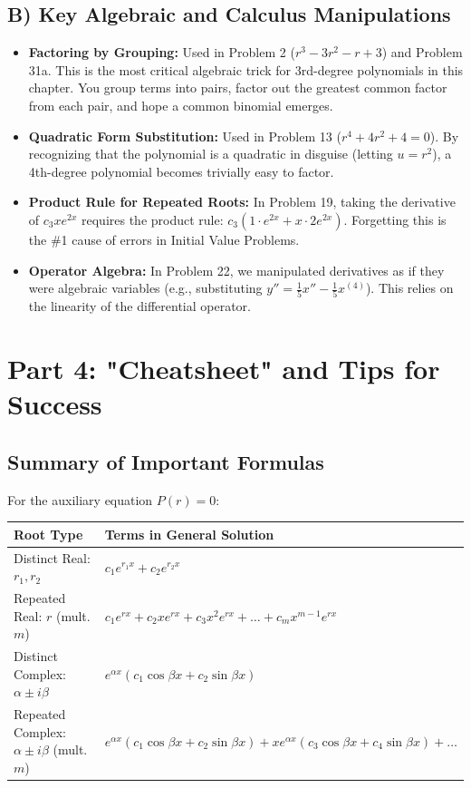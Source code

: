\documentclass[11pt]{article}
\begin{document}
\subsection{B) Key Algebraic and Calculus Manipulations}
\begin{itemize}
    \item \textbf{Factoring by Grouping:} Used in Problem 2 ($r^3 - 3r^2 - r + 3$) and Problem 31a. This is the most critical algebraic trick for 3rd-degree polynomials in this chapter. You group terms into pairs, factor out the greatest common factor from each pair, and hope a common binomial emerges.
    \item \textbf{Quadratic Form Substitution:} Used in Problem 13 ($r^4 + 4r^2 + 4 = 0$). By recognizing that the polynomial is a quadratic in disguise (letting $u = r^2$), a 4th-degree polynomial becomes trivially easy to factor.
    \item \textbf{Product Rule for Repeated Roots:} In Problem 19, taking the derivative of $c_3 x e^{2x}$ requires the product rule: $c_3(1 \cdot e^{2x} + x \cdot 2e^{2x})$. Forgetting this is the \#1 cause of errors in Initial Value Problems.
    \item \textbf{Operator Algebra:} In Problem 22, we manipulated derivatives as if they were algebraic variables (e.g., substituting $y'' = \frac{1}{5}x'' - \frac{1}{5}x^{(4)}$). This relies on the linearity of the differential operator.
\end{itemize}

\newpage
\section{Part 4: "Cheatsheet" and Tips for Success}

\subsection{Summary of Important Formulas}
For the auxiliary equation $P(r) = 0$:
\begin{center}
\renewcommand{\arraystretch}{1.5}
\begin{tabular}{|l|l|}
\hline
\textbf{Root Type} & \textbf{Terms in General Solution} \\
\hline
Distinct Real: $r_1, r_2$ & $c_1 e^{r_1 x} + c_2 e^{r_2 x}$ \\
\hline
Repeated Real: $r$ (mult. $m$) & $c_1 e^{rx} + c_2 x e^{rx} + c_3 x^2 e^{rx} + \dots + c_m x^{m-1} e^{rx}$ \\
\hline
Distinct Complex: $\alpha \pm i\beta$ & $e^{\alpha x}(c_1 \cos \beta x + c_2 \sin \beta x)$ \\
\hline
Repeated Complex: $\alpha \pm i\beta$ (mult. $m$) & $e^{\alpha x}(c_1 \cos \beta x + c_2 \sin \beta x) + x e^{\alpha x}(c_3 \cos \beta x + c_4 \sin \beta x) + \dots$ \\
\hline
\end{tabular}
\end{center}
\end{document}
